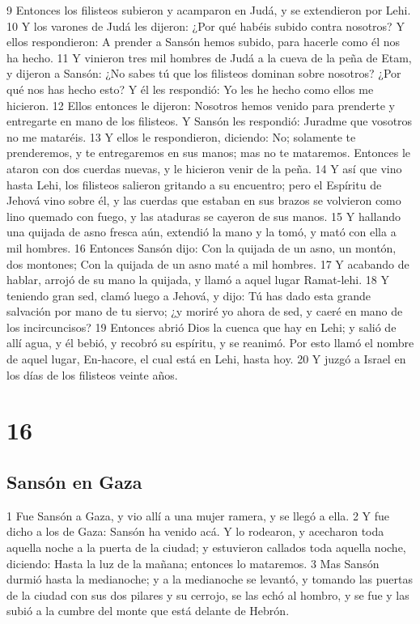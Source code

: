 9 Entonces los filisteos subieron y acamparon en Judá, y se extendieron por Lehi.
10 Y los varones de Judá les dijeron: ¿Por qué habéis subido contra nosotros? Y ellos respondieron: A prender a Sansón hemos subido, para hacerle como él nos ha hecho.
11 Y vinieron tres mil hombres de Judá a la cueva de la peña de Etam, y dijeron a Sansón: ¿No sabes tú que los filisteos dominan sobre nosotros? ¿Por qué nos has hecho esto? Y él les respondió: Yo les he hecho como ellos me hicieron.
12 Ellos entonces le dijeron: Nosotros hemos venido para prenderte y entregarte en mano de los filisteos. Y Sansón les respondió: Juradme que vosotros no me mataréis.
13 Y ellos le respondieron, diciendo: No; solamente te prenderemos, y te entregaremos en sus manos; mas no te mataremos. Entonces le ataron con dos cuerdas nuevas, y le hicieron venir de la peña.
14 Y así que vino hasta Lehi, los filisteos salieron gritando a su encuentro; pero el Espíritu de Jehová vino sobre él, y las cuerdas que estaban en sus brazos se volvieron como lino quemado con fuego, y las ataduras se cayeron de sus manos.
15 Y hallando una quijada de asno fresca aún, extendió la mano y la tomó, y mató con ella a mil hombres.
16 Entonces Sansón dijo:
Con la quijada de un asno, un montón, dos montones;
Con la quijada de un asno maté a mil hombres.
17 Y acabando de hablar, arrojó de su mano la quijada, y llamó a aquel lugar Ramat-lehi.
18 Y teniendo gran sed, clamó luego a Jehová, y dijo: Tú has dado esta grande salvación por mano de tu siervo; ¿y moriré yo ahora de sed, y caeré en mano de los incircuncisos?
19 Entonces abrió Dios la cuenca que hay en Lehi; y salió de allí agua, y él bebió, y recobró su espíritu, y se reanimó. Por esto llamó el nombre de aquel lugar, En-hacore, el cual está en Lehi, hasta hoy.
20 Y juzgó a Israel en los días de los filisteos veinte años.

\chapter{16}


\section*{Sansón en Gaza}


1 Fue Sansón a Gaza, y vio allí a una mujer ramera, y se llegó a ella.
2 Y fue dicho a los de Gaza: Sansón ha venido acá. Y lo rodearon, y acecharon toda aquella noche a la puerta de la ciudad; y estuvieron callados toda aquella noche, diciendo: Hasta la luz de la mañana; entonces lo mataremos.
3 Mas Sansón durmió hasta la medianoche; y a la medianoche se levantó, y tomando las puertas de la ciudad con sus dos pilares y su cerrojo, se las echó al hombro, y se fue y las subió a la cumbre del monte que está delante de Hebrón.

